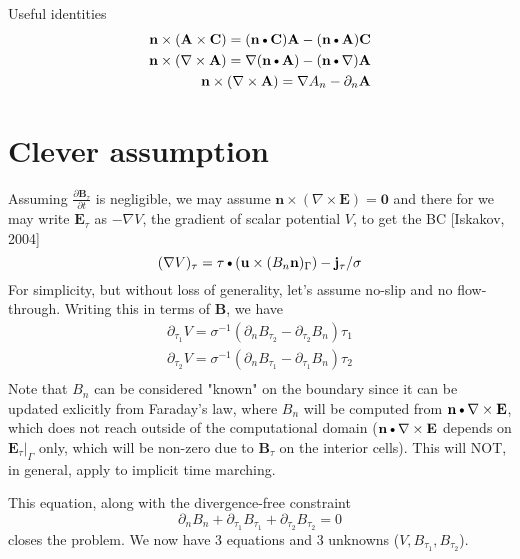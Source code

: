 \documentclass[11pt]{article}
\newcommand{\B}{\mathbf{B}}
\newcommand{\C}{\mathbf{C}}
\newcommand{\U}{\mathbf{u}}
\newcommand{\curl}{\nabla \times}
\newcommand{\A}{\mathbf{A}}
\newcommand{\PD}{\partial}
\newcommand{\J}{\mathbf{j}}
\newcommand{\E}{\mathbf{E}}
\newcommand{\N}{\mathbf{n}}
\newcommand{\DOT}{\text{\textbullet}}
\begin{document}
Useful identities
\begin{equation}\begin{aligned}
  \N \times (\A \times \C) = (\N \DOT \C) \A - (\N \DOT \A) \C \\
  \N \times (\nabla \times \A) = \nabla(\N \DOT \A) - (\N \DOT \nabla) \A \\
  \N \times (\nabla \times \A) = \nabla A_n - \PD_n \A \\
\end{aligned}\end{equation}

\newpage
\section{Clever assumption}
Assuming $\frac{\PD \B_{\tau}}{\PD t}$ is negligible, we may assume $\N \times (\curl \E) = \mathbf{0}$ and there for we may write $\E_{\tau}$ as $-\nabla V$, the gradient of scalar potential $V$, to get the BC [Iskakov, 2004]
\begin{equation}
  (\nabla V)_{\tau} = \tau \DOT (\U \times (B_n \N)_\Gamma) - \J_{\tau}/\sigma
\end{equation}
For simplicity, but without loss of generality, let's assume no-slip and no flow-through. Writing this in terms of $\B$, we have
\begin{equation}
\begin{aligned}
  \PD_{\tau_1} V = \sigma^{-1}(\PD_n B_{\tau_2} - \PD_{\tau_2} B_n) \hat{\tau_1} \\
  \PD_{\tau_2} V = \sigma^{-1} (\PD_n B_{\tau_1} - \PD_{\tau_1} B_n) \hat{\tau_2} \\
\end{aligned}
\end{equation}
Note that $B_n$ can be considered "known" on the boundary since it can be updated exlicitly from Faraday's law, where $B_n$ will be computed from $\N \DOT \curl \E$, which does not reach outside of the computational domain ($\N \DOT \curl \E$ depends on $\E_{\tau}|_{\Gamma}$ only, which will be non-zero due to $\B_{\tau}$ on the interior cells). This will NOT, in general, apply to implicit time marching.

This equation, along with the divergence-free constraint
\begin{equation}
  \PD_n B_n + \PD_{\tau_1} B_{\tau_1} + \PD_{\tau_2} B_{\tau_2} = 0
\end{equation}
closes the problem. We now have 3 equations and 3 unknowns ($V,B_{\tau_1},B_{\tau_2}$).
\end{document}
